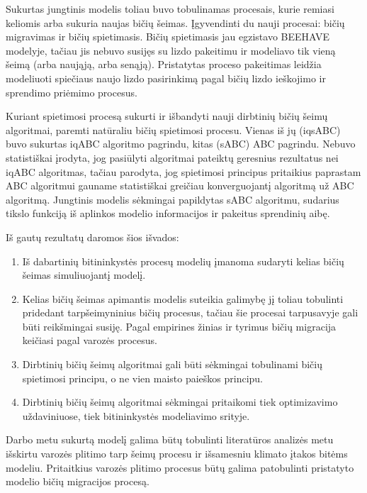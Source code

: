 \documentclass{VUMIFKompMagistrinis}
\begin{document}
Sukurtas jungtinis modelis toliau buvo tobulinamas procesais, kurie remiasi keliomis arba sukuria naujas bičių šeimas. Įgyvendinti du nauji procesai: bičių migravimas ir bičių spietimasis. Bičių spietimasis jau egzistavo BEEHAVE modelyje, tačiau jis nebuvo susijęs su lizdo pakeitimu ir modeliavo tik vieną šeimą (arba naująją, arba senąją). Pristatytas proceso pakeitimas leidžia modeliuoti spiečiaus naujo lizdo pasirinkimą pagal bičių lizdo ieškojimo ir sprendimo priėmimo procesus.

Kuriant spietimosi procesą sukurti ir išbandyti nauji dirbtinių bičių šeimų algoritmai, paremti natūraliu bičių spietimosi procesu. Vienas iš jų (iqsABC) buvo sukurtas iqABC algoritmo pagrindu, kitas (sABC) ABC pagrindu. Nebuvo statistiškai įrodyta, jog pasiūlyti algoritmai pateiktų geresnius rezultatus nei iqABC algoritmas, tačiau parodyta, jog spietimosi principus pritaikius paprastam ABC algoritmui gauname statistiškai greičiau konverguojantį algoritmą už ABC algoritmą. Jungtinis modelis sėkmingai papildytas sABC algoritmu, sudarius tikslo funkciją iš aplinkos modelio informacijos ir pakeitus sprendinių aibę.

Iš gautų rezultatų daromos šios išvados:
\begin{enumerate}
    \item Iš dabartinių bitininkystės procesų modelių įmanoma sudaryti kelias bičių šeimas simuliuojantį modelį.
    \item Kelias bičių šeimas apimantis modelis suteikia galimybę jį toliau tobulinti pridedant tarpšeimyninius bičių procesus, tačiau šie procesai tarpusavyje gali būti reikšmingai susiję. Pagal empirines žinias ir tyrimus bičių migracija keičiasi pagal varozės procesus.
    \item Dirbtinių bičių šeimų algoritmai gali būti sėkmingai tobulinami bičių spietimosi principu, o ne vien maisto paieškos principu.
    \item Dirbtinių bičių šeimų algoritmai sėkmingai pritaikomi tiek optimizavimo uždaviniuose, tiek bitininkystės modeliavimo srityje.
\end{enumerate}


Darbo metu sukurtą modelį galima būtų tobulinti literatūros analizės metu išskirtu varozės plitimo tarp šeimų procesu ir išsamesniu klimato įtakos bitėms modeliu. Pritaitkius varozės plitimo procesus būtų galima patobulinti pristatyto modelio bičių migracijos procesą.

\end{document}
